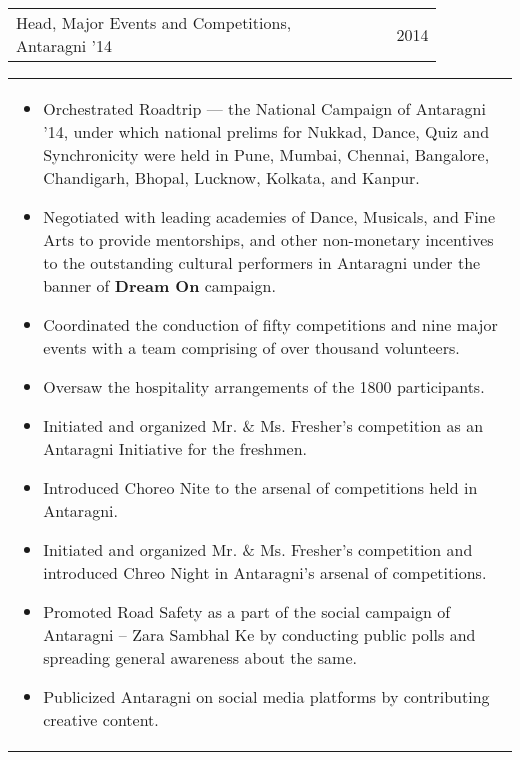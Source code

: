 \documentclass[a4paper,10pt]{article} %
\newcommand{\iproject}[3]{
    \begin{tabular}{p{0.85\linewidth}r}
        \textcolor{NavyBlue}{#2} & \multicolumn{1}{m{3cm}}{\raggedleft \textsc{#1}}\\
    \end{tabular}
    \begin{tabular}{p{\linewidth}}
    \vspace{-0.3cm}
        \footnotesize{#3}
    \end{tabular}
    \vspace{-0.5cm}
}
\begin{document}
\iproject {2014}
          {Head, Major Events and Competitions, Antaragni '14}
          {
               \begin{itemize}[leftmargin=0.5cm]
                    \item Orchestrated Roadtrip --- the National Campaign of Antaragni '14, under which national prelims for Nukkad,
                        Dance, Quiz and Synchronicity were held in Pune, Mumbai, Chennai, Bangalore, Chandigarh, Bhopal, Lucknow,
                        Kolkata, and Kanpur.
                    \item Negotiated with leading academies of Dance, Musicals, and Fine Arts to provide mentorships, and other
                        non-monetary incentives to the outstanding cultural performers in Antaragni under the banner
                        of \textbf{Dream On} campaign.
                    \item Coordinated the conduction of fifty competitions and nine major events with a team comprising of over
                        thousand volunteers.
                    \item Oversaw the hospitality arrangements of the 1800 participants.
                    \item Initiated and organized Mr. \& Ms. Fresher's competition as an Antaragni Initiative for the freshmen.
                    \item Introduced Choreo Nite to the arsenal of competitions held in Antaragni.
                    \item Initiated and organized Mr. \& Ms. Fresher's competition and introduced Chreo Night in Antaragni's arsenal of competitions.
                    \item Promoted Road Safety as a part of the social campaign of Antaragni -- Zara Sambhal Ke by conducting
                        public polls and spreading general awareness about the same.
                    \item Publicized Antaragni on social media platforms by contributing creative content.
               \end{itemize}
          }
\end{document}
